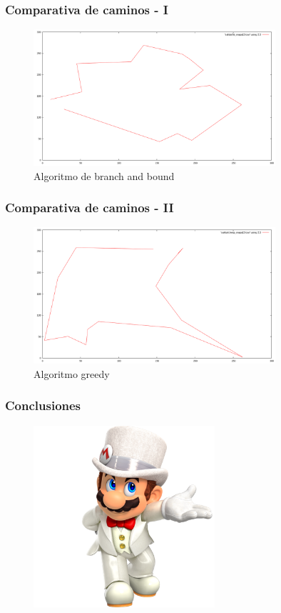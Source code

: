 \documentclass[spanish]{beamer}
\begin{document}
\begin{frame}[fragile]\frametitle{Comparativa de caminos - I}
\begin{figure}[H]
	\centering
	\includegraphics[width=0.8\textwidth]{bb_mapa15}
	\caption{Algoritmo de branch and bound}
\end{figure}
\end{frame}

\begin{frame}[fragile]\frametitle{Comparativa de caminos - II}
\begin{figure}[H]
	\centering
	\includegraphics[width=0.8\textwidth]{cheap_mapa15}
	\caption{Algoritmo greedy}
\end{figure}
\end{frame}

\begin{frame}\frametitle{Conclusiones}
	\begin{figure}[H]
		\centering
		\includegraphics[width=0.6\textwidth]{mario}
	\end{figure}
\end{frame}
\end{document}
